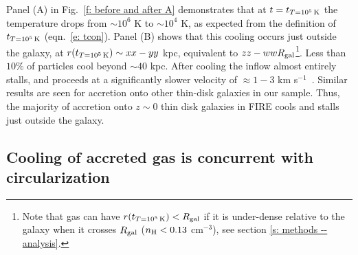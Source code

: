 \documentclass[fleqn,usenatbib]{mnras}
\newcommand{\Rcon}{R_{T=10^5\,{\rm K}}}
\newcommand{\tcon}{t_{T=10^5\,{\rm K}}}
\begin{document}
Panel (A) in Fig.~\ref{f: before and after A} demonstrates that at $t = \tcon$ the temperature drops from $\sim10^6$ K to $\sim10^4$ K,  as expected from the definition of $\tcon$ (eqn.~\ref{e: tcon}). Panel (B) shows that this cooling occurs just outside the galaxy, at $r(\tcon) \sim xx-yy$ kpc, equivalent to $zz - ww R_{\rm gal}$\footnote{Note that gas can have $r(\tcon) < R_{\rm gal}$ if it is under-dense relative to the galaxy when it crosses $R_{\rm gal}$ ($n_{\rm H} < 0.13$ cm$^{-3}$), see section \ref{s: methods -- analysis}.}. Less than $10\%$ of particles cool beyond $\sim 40$ kpc. After cooling the inflow almost entirely stalls, and proceeds at a significantly slower velocity of $\approx1-3$ km s$^{-1}$~\citep[within the disk, see below and also][]{Trapp2021}. Similar results are seen for accretion onto other thin-disk galaxies in our sample. Thus, the majority of accretion onto $z\sim0$ thin disk galaxies in FIRE cools and stalls just outside the galaxy. 




\subsection{Cooling of accreted gas is concurrent with circularization}
\label{s: characteristics -- aligns}
\end{document}
